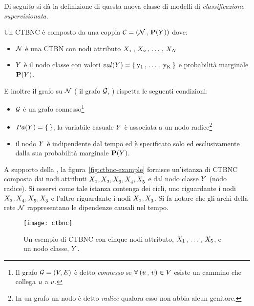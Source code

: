 Di seguito si dà la definizione di questa nuova classe di modelli di \emph{classificazione supervisionata}.
\begin{definizione}\label{defn:ctbnc}
Un \acf{CTBNC} è composto da una coppia $\mathcal{C}=(\mathcal{N}\,,\,\mathbf{P}(\mathnormal{Y}))$ dove:
\begin{itemize}
    \item $\mathcal{N}$ è una \acs{CTBN} con nodi attributo $\mathnormal{X_1}\,,\,\mathnormal{X_2}\,,\,\dotsc\,,\,\mathnormal{X_N}$
    \item $\mathnormal{Y}$ è il nodo classe con valori $val(\mathnormal{Y})=\{\,\mathrm{y_1}\,,\,\dotsc\,,\,\mathrm{y_K}\,\}$ e probabilità marginale $\mathbf{P}(\mathnormal{Y})$.
\end{itemize}
E inoltre il grafo su $\mathcal{N}$ (\ie{} il grafo $\mathcal{G}$, ) rispetta le seguenti condizioni:
\begin{itemize}
    \item $\mathcal{G}$ è un grafo connesso\footnote{Il grafo $\mathcal{G} = (\mathnormal{V}, \mathnormal{E})$ è detto \emph{connesso} se $\forall \: (\mathnormal{u}\,,\,\mathnormal{v}) \in \mathnormal{V}$ esiste un cammino che collega $\mathnormal{u}$ a $\mathnormal{v}$.}
    \item $Pa(\mathnormal{Y})=\{\,\}$, \ie{} la variabile casuale $\mathnormal{Y}$ è associata a un nodo radice\footnote{In un grafo un nodo è detto \emph{radice} qualora esso non abbia alcun genitore.}
    \item il nodo $\mathnormal{Y}$ è indipendente dal tempo ed è specificato solo ed esclusivamente dalla sua probabilità marginale $\mathbf{P}(\mathnormal{Y})$.
\end{itemize}
\end{definizione}
A supporto della , la figura~\vref{fig:ctbnc-example} fornisce un'istanza di \acs{CTBNC} composta dai nodi attributi $\mathnormal{X_1},\mathnormal{X_2},\mathnormal{X_3},\mathnormal{X_4},\mathnormal{X_5}$ e dal nodo classe $\mathnormal{Y}$ (nodo radice). Si osservi come tale istanza contenga dei cicli, uno riguardante i nodi $\mathnormal{X_2},\mathnormal{X_4},\mathnormal{X_5},\mathnormal{X_3}$ e l'altro riguardante i nodi $\mathnormal{X_1},\mathnormal{X_3}$. Si fa notare che gli archi della rete $\mathcal{N}$ rappresentano le dipendenze causali nel tempo.

\newpage

\begin{figure}
\centering
\texttt{[image: ctbnc]}
\caption[Un esempio di \acs{CTBNC}]{Un esempio di \acf{CTBNC} con cinque nodi attributo, $\mathnormal{X}_1\,,\,\dotsc\,,\,\mathnormal{X}_5$, e un nodo classe, $\mathnormal{Y}$.}
\label{fig:ctbnc-example}
\end{figure}

